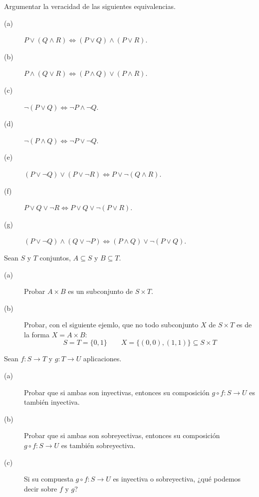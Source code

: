 \begin{ejercicio}
    Argumentar la veracidad de las siguientes equivalencias.
    \begin{description}
        \item [(a)] $P\lor(Q\land R) \Longleftrightarrow (P\lor Q)\land (P\lor R)$.
        \item [(b)] $P\land(Q\lor R) \Longleftrightarrow (P\land Q)\lor (P\land R)$.
        \item [(c)] $\neg(P\lor Q)\Longleftrightarrow \neg P \land \neg Q$.
        \item [(d)] $\neg(P\land Q)\Longleftrightarrow \neg P \lor \neg Q$.
        \item [(e)] $(P\lor \neg Q) \lor (P\lor \neg R) \Longleftrightarrow P\lor \neg (Q\land R)$.
        \item [(f)] $P\lor Q\lor \neg R \Longleftrightarrow P\lor Q\lor \neg (P\lor R)$.
        \item [(g)] $(P\lor \neg Q)\land(Q\lor \neg P)\Longleftrightarrow (P\land Q)\lor\neg(P\lor Q)$.
    \end{description}
\end{ejercicio}

\begin{ejercicio}
    Sean $S$ y $T$ conjuntos, $A\subseteq S$ y $B\subseteq T$.
    \begin{description}
        \item [(a)] Probar $A\times B$ es un subconjunto de $S\times T$.
        \item [(b)] Probar, con el siguiente ejemlo, que no todo subconjunto $X$ de $S\times T$ es de la forma $X=A\times B$:
            \begin{equation*}
                S = T = \{ 0,1 \} \qquad X = \{(0,0), (1,1)\} \subseteq S\times T
            \end{equation*}
    \end{description}
\end{ejercicio}

\begin{ejercicio}
    Sean $f:S\to T$ y $g:T\to U$ aplicaciones.
    \begin{description}
        \item [(a)] Probar que si ambas son inyectivas, entonces su composición $g\circ f:S\to U$ es también inyectiva.
        \item [(b)] Probar que si ambas son sobreyectivas, entonces su composición $g\circ f:S\to U$ es también sobreyectiva.
        \item [(c)] Si su compuesta $g\circ f:S\to U$ es inyectiva o sobreyectiva, ¿qué podemos decir sobre $f$ y $g$?
    \end{description}
\end{ejercicio}


